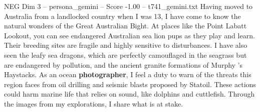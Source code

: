 \begin{textsample}{NEG Dim 3 – persona\_gemini – Score -1.00 – t741\_gemini.txt}  \label{ex:f3_neg_002}
Having moved to Australia from a landlocked country when I was 13, I have come to know the natural wonders of the Great Australian Bight.
At places like the Point Labatt Lookout, you can see endangered Australian sea lion pups as they play and learn.
Their breeding sites are fragile and highly sensitive to disturbances.
I have also seen the leafy sea dragons, which are perfectly camouflaged in the seagrass but are endangered by pollution, and the ancient granite formations of Murphy ’s Haystacks.
As an ocean \textbf{photographer}, I feel a duty to warn of the threats this region faces from oil drilling and seismic blasts proposed by Statoil.
These actions could harm marine life that relies on sound, like dolphins and cuttlefish.
Through the images from my explorations, I share what is at stake.

\end{textsample}
